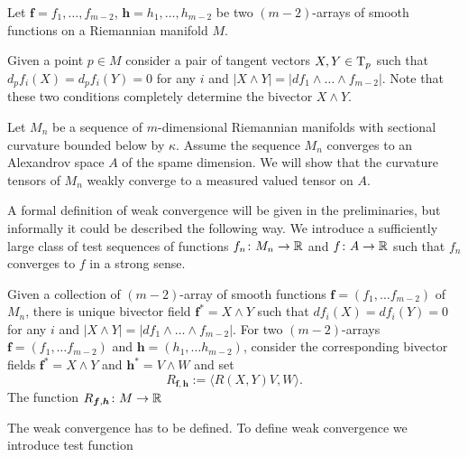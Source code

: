 Let $\bm{f}=f_1,\dots,f_{m-2}$, 
$\bm{h}=h_1,\dots,h_{m-2}$ be two $(m-2)$-arrays of smooth functions on a Riemannian manifold $M$.

Given a point $p\in M$ consider a pair of tangent vectors $X,Y\in \text{\rm T}_p$ such that 
$d_pf_i(X)=d_pf_i(Y)=0$ for any $i$ and $|X\wedge Y|=|df_1\wedge \dots\wedge f_{m-2}|$.
Note that these two conditions completely determine the bivector $X\wedge Y$.

Let $M_n$ be a sequence of $m$-dimensional Riemannian manifolds with sectional curvature bounded below by $\kappa$.
Assume the sequence $M_n$ converges to an Alexandrov space $A$ of the spame dimension.
We will show that the curvature tensors of $M_n$ weakly converge to a measured valued tensor on $A$.

A formal definition of weak convergence will be given in the preliminaries,
but informally it could be described the following way.
We introduce a sufficiently large class of test sequences of functions $f_n\colon M_n\to\mathbb{R}$ and $f\colon A\to \mathbb{R}$ such that $f_n$ converges to $f$ in a strong sense.

Given a collection of $(m-2)$-array of smooth functions $\bm{f}=(f_1,\dots f_{m-2})$ of $M_n$,
there is unique bivector field $\bm{f}^*=X\wedge Y$ such that $df_i(X)=df_i(Y)=0$ for any $i$ and 
$|X\wedge Y|=|df_1\wedge \dots\wedge f_{m-2}|$.
For two $(m-2)$-arrays $\bm{f}=(f_1,\dots f_{m-2})$ and $\bm{h}=(h_1,\dots h_{m-2})$, consider the corresponding bivector fields $\bm{f}^*=X\wedge Y$ and $\bm{h}^*=V\wedge W$ and set
\[R_{\bm{f},\bm{h}}:=\langle R(X,Y)V,W\rangle.\]
The function $R_{\bm{f},\bm{h}}\colon M\to \mathbb{R}$

The weak convergence has to be defined.
To define weak convergence we introduce test function
